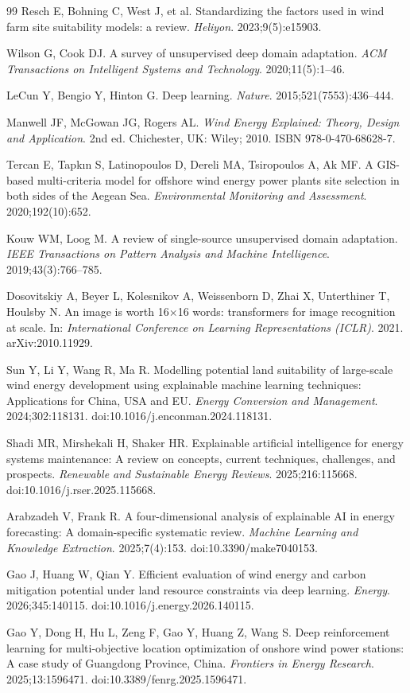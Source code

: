 \documentclass[12pt, a4paper]{article}
\begin{document}
\begin{thebibliography}{99}
Resch E, Bohning C, West J, et al.
Standardizing the factors used in wind farm site suitability
models: a review.
\textit{Heliyon}.
2023;9(5):e15903.

Wilson G, Cook DJ.
A survey of unsupervised deep domain adaptation.
\textit{ACM Transactions on Intelligent Systems and Technology}.
2020;11(5):1--46.

LeCun Y, Bengio Y, Hinton G.
Deep learning.
\textit{Nature}.
2015;521(7553):436--444.

Manwell JF, McGowan JG, Rogers AL.
\textit{Wind Energy Explained: Theory, Design and Application}.
2nd ed. Chichester, UK: Wiley; 2010.
ISBN 978-0-470-68628-7.

Tercan E, Tapkın S, Latinopoulos D, Dereli MA, Tsiropoulos A,
Ak MF.
A GIS-based multi-criteria model for offshore wind energy power
plants site selection in both sides of the Aegean Sea.
\textit{Environmental Monitoring and Assessment}.
2020;192(10):652.

Kouw WM, Loog M.
A review of single-source unsupervised domain adaptation.
\textit{IEEE Transactions on Pattern Analysis and Machine
Intelligence}.
2019;43(3):766--785.

Dosovitskiy A, Beyer L, Kolesnikov A, Weissenborn D, Zhai X,
Unterthiner T, Houlsby N.
An image is worth 16$\times$16 words: transformers for image
recognition at scale.
In: \textit{International Conference on Learning Representations
(ICLR)}. 2021.
arXiv:2010.11929.

Sun Y, Li Y, Wang R, Ma R.
Modelling potential land suitability of large-scale wind energy
development using explainable machine learning techniques:
Applications for China, USA and EU.
\textit{Energy Conversion and Management}.
2024;302:118131.
doi:10.1016/j.enconman.2024.118131.

Shadi MR, Mirshekali H, Shaker HR.
Explainable artificial intelligence for energy systems
maintenance: A review on concepts, current techniques,
challenges, and prospects.
\textit{Renewable and Sustainable Energy Reviews}.
2025;216:115668.
doi:10.1016/j.rser.2025.115668.

Arabzadeh V, Frank R.
A four-dimensional analysis of explainable AI in energy
forecasting: A domain-specific systematic review.
\textit{Machine Learning and Knowledge Extraction}.
2025;7(4):153.
doi:10.3390/make7040153.

Gao J, Huang W, Qian Y.
Efficient evaluation of wind energy and carbon mitigation
potential under land resource constraints via deep learning.
\textit{Energy}.
2026;345:140115.
doi:10.1016/j.energy.2026.140115.

Gao Y, Dong H, Hu L, Zeng F, Gao Y, Huang Z, Wang S.
Deep reinforcement learning for multi-objective location
optimization of onshore wind power stations: A case study of
Guangdong Province, China.
\textit{Frontiers in Energy Research}.
2025;13:1596471.
doi:10.3389/fenrg.2025.1596471.

\end{thebibliography}
\end{document}
